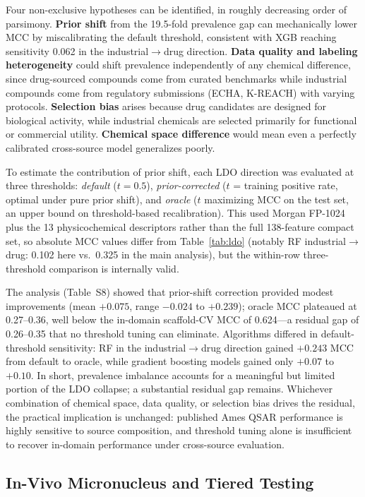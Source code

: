 Four non-exclusive hypotheses can be identified, in roughly decreasing order of parsimony.
\textbf{Prior shift} from the 19.5-fold prevalence gap can mechanically lower MCC by miscalibrating the default threshold,
consistent with XGB reaching sensitivity 0.062 in the industrial$\to$drug direction. \textbf{Data quality and labeling heterogeneity} could shift prevalence independently of any chemical difference,
since drug-sourced compounds come from curated benchmarks while industrial compounds come from regulatory submissions (ECHA, K-REACH) with varying protocols.
\textbf{Selection bias} arises because drug candidates are designed for biological activity, while industrial chemicals are selected primarily for functional or commercial utility.
\textbf{Chemical space difference}\cite{Lipinski_2004,Veber_2002} would mean even a perfectly calibrated cross-source model generalizes poorly.

To estimate the contribution of prior shift, each LDO direction was evaluated at three thresholds: \textit{default} ($t = 0.5$), \textit{prior-corrected} ($t$ = training positive rate, optimal under pure prior shift),
and \textit{oracle} ($t$ maximizing MCC on the test set, an upper bound on threshold-based recalibration).
This used Morgan FP-1024 plus the 13 physicochemical descriptors rather than the full 138-feature compact set,
so absolute MCC values differ from Table~\ref{tab:ldo} (notably RF industrial$\to$drug: 0.102 here vs.\ 0.325 in the main analysis),
but the within-row three-threshold comparison is internally valid.

The analysis (Table~S8) showed that prior-shift correction provided modest improvements (mean $+0.075$, range $-0.024$ to $+0.239$);
oracle MCC plateaued at 0.27--0.36, well below the in-domain scaffold-CV MCC of 0.624---a residual gap of 0.26--0.35 that no threshold tuning can eliminate.
Algorithms differed in default-threshold sensitivity: RF in the industrial$\to$drug direction gained $+0.243$ MCC from default to oracle,
while gradient boosting models gained only $+0.07$ to $+0.10$. In short, prevalence imbalance accounts for a meaningful but limited portion of the LDO collapse; a substantial residual gap remains.
Whichever combination of chemical space, data quality, or selection bias drives the residual, the practical implication is unchanged:
published Ames QSAR performance is highly sensitive to source composition, and threshold tuning alone is insufficient to recover in-domain performance under cross-source evaluation.

\subsection{In-Vivo Micronucleus and Tiered Testing}


